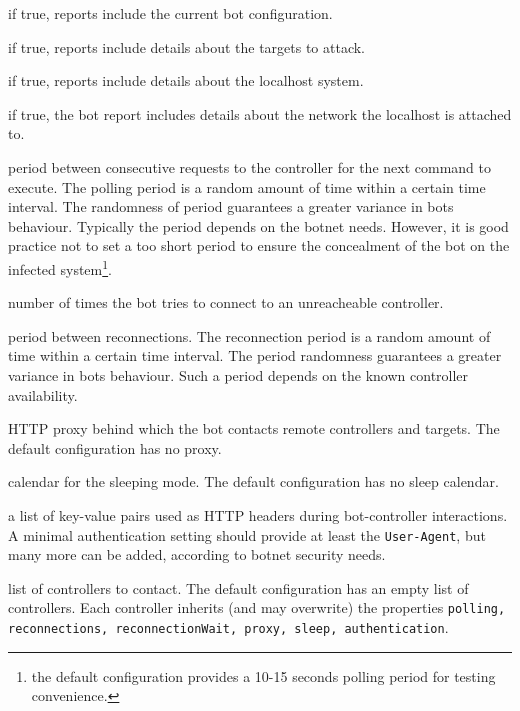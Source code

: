 \begin{description}
  \setlength\itemsep{1em}

  \item[cnfInfo] if true, reports include the current bot configuration.

  \item[tgtInfo] if true, reports include details about the targets to attack.

  \item[sysInfo] if true, reports include details about the localhost system.

  \item[netInfo] if true, the bot report includes details about the network the localhost is attached to.

  \item[polling] period between consecutive requests to the controller for the next command to execute. The polling period is a random amount of time within a certain time interval. The randomness of period guarantees a greater variance in bots behaviour. Typically the period depends on the botnet needs. However, it is good practice not to set a too short period to ensure the concealment of the bot on the infected system\footnote{the default configuration provides a 10-15 seconds polling period for testing convenience.}.

  \item[reconnections] number of times the bot tries to connect to an unreacheable controller.

  \item[reconnectionWait] period between reconnections. The reconnection period is a random amount of time within a certain time interval. The period randomness guarantees a greater variance in bots behaviour. Such a period depends on the known controller availability.

  \item[proxy] HTTP proxy behind which the bot contacts remote controllers and targets. The default configuration has no proxy.

  \item[sleep] calendar for the sleeping mode. The default configuration has no sleep calendar.

  \item[authentication] a list of key-value pairs used as HTTP headers during bot-controller interactions. A minimal authentication setting should provide at least the \texttt{User-Agent}, but many more can be added, according to botnet security needs.

  \item[controllers] list of controllers to contact. The default configuration has an empty list of controllers. Each controller inherits (and may overwrite) the properties \texttt{polling, reconnections, reconnectionWait, proxy, sleep, authentication}.

\end{description}

